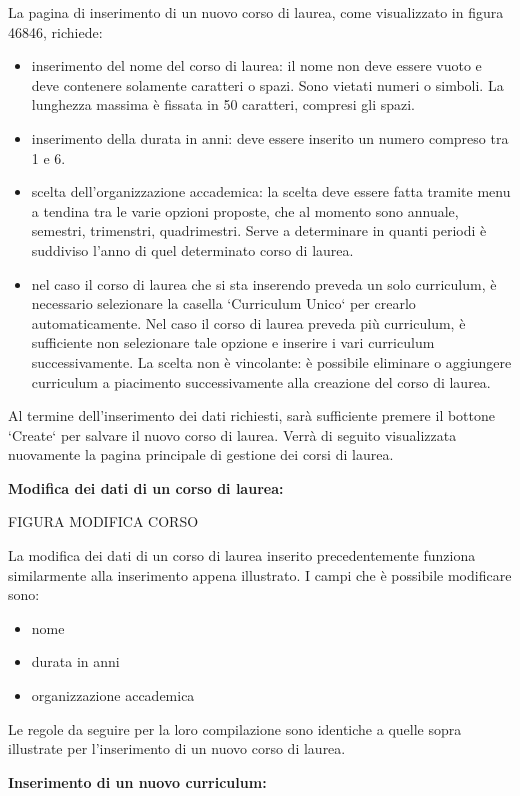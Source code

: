 \documentclass[11pt,a4paper]{article}
\begin{document}
La pagina di inserimento di un nuovo corso di laurea, come visualizzato in figura 46846, richiede:
\begin{itemize}
 \item inserimento del nome del corso di laurea: il nome non deve essere vuoto e deve contenere solamente caratteri o spazi. Sono vietati numeri o simboli. La lunghezza massima è fissata in 50 caratteri, compresi gli spazi.
 \item inserimento della durata in anni: deve essere inserito un numero compreso tra 1 e 6.
 \item scelta dell'organizzazione accademica: la scelta deve essere fatta tramite menu a tendina tra le varie opzioni proposte, che al momento sono annuale, semestri, trimenstri, quadrimestri. Serve a determinare in quanti periodi è suddiviso l'anno di quel determinato corso di laurea.
 \item nel caso il corso di laurea che si sta inserendo preveda un solo curriculum, è necessario selezionare la casella `Curriculum Unico` per crearlo automaticamente. Nel caso il corso di laurea preveda più curriculum, è sufficiente non selezionare tale opzione e inserire i vari curriculum successivamente. La scelta non è vincolante: è possibile eliminare o aggiungere curriculum a piacimento successivamente alla creazione del corso di laurea.
\end{itemize}
Al termine dell'inserimento dei dati richiesti, sarà sufficiente premere il bottone `Create` per salvare il nuovo corso di laurea. Verrà di seguito visualizzata nuovamente la pagina principale di gestione dei corsi di laurea. 
\newline \newline
\begin{large}\textbf{Modifica dei dati di un corso di laurea:}\end{large}

\begin{LARGE}FIGURA MODIFICA CORSO\end{LARGE}

La modifica dei dati di un corso di laurea inserito precedentemente funziona similarmente alla inserimento appena illustrato. I campi che è possibile modificare sono:
\begin{itemize}
 \item nome
 \item durata in anni
 \item organizzazione accademica
\end{itemize}
Le regole da seguire per la loro compilazione sono identiche a quelle sopra illustrate per l'inserimento di un nuovo corso di laurea.
\newline \newline
\begin{large}\textbf{Inserimento di un nuovo curriculum:}\end{large}
\end{document}
